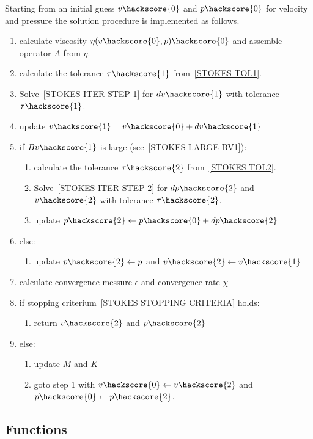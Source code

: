 Starting from an initial guess $v\hackscore{0}$ and $p\hackscore{0}$ for velocity and pressure
the solution procedure is implemented as follows.
\begin{enumerate}
 \item calculate viscosity $\eta(v\hackscore{0},p)\hackscore{0}$ and assemble operator $A$ from $\eta$.
 \item calculate the tolerance $\tau\hackscore{1}$ from~\ref{STOKES TOL1}.
 \item Solve~\ref{STOKES ITER STEP 1} for $dv\hackscore{1}$ with tolerance $\tau\hackscore{1}$.
 \item update $v\hackscore{1}= v\hackscore{0}+ dv\hackscore{1}$
 \item if $Bv\hackscore{1}$ is large (see~\ref{STOKES LARGE BV1}):
 \begin{enumerate}
 \item calculate the tolerance $\tau\hackscore{2}$ from~\ref{STOKES TOL2}.
 \item Solve~\ref{STOKES ITER STEP 2} for $dp\hackscore{2}$ and $v\hackscore{2}$ with tolerance $\tau\hackscore{2}$.
 \item update $p\hackscore{2}\leftarrow p\hackscore{0}+ dp\hackscore{2}$
 \end{enumerate}
 \item else:
  \begin{enumerate}
  \item update $p\hackscore{2}\leftarrow p$ and $v\hackscore{2}\leftarrow v\hackscore{1}$
   \end{enumerate}
   \item calculate convergence messure $\epsilon$ and convergence rate $\chi$
\item if stopping criterium~\ref{STOKES STOPPING CRITERIA} holds:
 \begin{enumerate}
 \item return $v\hackscore{2}$ and $p\hackscore{2}$
 \end{enumerate}
 \item else:
 \begin{enumerate}

     \item update $M$ and $K$
     \item goto step 1 with $v\hackscore{0}\leftarrow v\hackscore{2}$ and $p\hackscore{0}\leftarrow p\hackscore{2}$.
\end{enumerate}
\end{enumerate}

\subsection{Functions}

